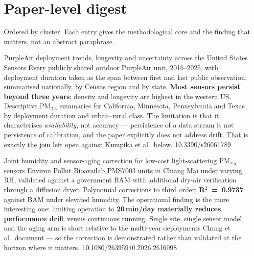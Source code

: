 \documentclass[10pt]{article}
\begin{document}
\clearpage

\section*{\sffamily\bfseries\color{Deep}Paper-level digest}
\vspace{-1.5mm}{\color{Amber}\rule{\linewidth}{1.1pt}}\vspace{1mm}

{\fontsize{7.4}{9}\selectfont\color{Slate}Ordered by cluster. Each entry gives the
methodological core and the finding that matters, not an abstract paraphrase.\par}


{PurpleAir deployment trends, longevity and uncertainty across the United States}
{Sensors}
{Every publicly shared outdoor PurpleAir unit, 2016--2025, with deployment duration taken
as the span between first and last public observation, summarised nationally, by Census
region and by state. \textbf{Most sensors persist beyond three years}; density and
longevity are highest in the western US. Descriptive PM$_{2.5}$ summaries for California,
Minnesota, Pennsylvania and Texas by deployment duration and urban--rural class. The
limitation is that it characterises \emph{availability}, not accuracy --- persistence of a
data stream is not persistence of calibration, and the paper explicitly does not address
drift. That is exactly the join left open against Kumpika et al.\ below.}
{10.3390/s26061789}

{Joint humidity and sensor-aging correction for low-cost light-scattering PM$_{2.5}$ sensors}
{Environ Pollut Bioavailab}
{PMS7003 units in Chiang Mai under varying RH, validated against a government BAM with
additional dry-air verification through a diffusion dryer. Polynomial corrections to third
order; \textbf{R$^2$~=~0.9737} against BAM under elevated humidity. The operational finding
is the more interesting one: limiting operation to \textbf{20\,min/day materially reduces
performance drift} versus continuous running. Single site, single sensor model, and the
aging arm is short relative to the multi-year deployments Chung et al.\ document --- so the
correction is demonstrated rather than validated at the horizon where it matters.}
{10.1080/26395940.2026.2616098}
\end{document}
